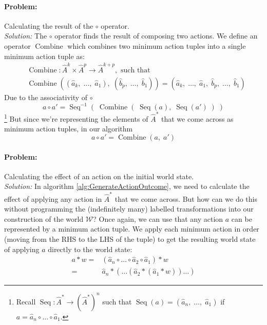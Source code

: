 \paragraph{Problem:}
Calculating the result of the $\circ$ operator.
\\\textit{Solution:}
The $\circ$ operator finds the result of composing two actions.
We define an operator $\operatorname{Combine}$ which combines two minimum action tuples into a single minimum action tuple as:
\begin{equation}
\begin{aligned}
    & \operatorname{Combine}: \hat{A}^{k} \times \hat{A}^{p} \to \hat{A}^{k+p}, \text{ such that} \\
    & \operatorname{Combine}((\hat{a}_{k}, \; \dots, \; \hat{a}_{1}), \; (\hat{b}_{p}, \; \dots, \; \hat{b}_{1})) = (\hat{a}_{k}, \; \dots, \; \hat{a}_{1}, \; \hat{b}_{p}, \; \dots, \; \hat{b}_{1})
\end{aligned}
\end{equation}
Due to the associativity of $\circ$
\begin{equation}
      a \circ a' = \operatorname{Seq}^{-1}(\;\operatorname{Combine}(\;\operatorname{Seq}(a), \; \operatorname{Seq}(a')\;)\;)
\end{equation}
\footnote{
Recall $\operatorname{Seq}: \hat{A}^{*} \to (\hat{A}^{*})^{n}$ such that $\operatorname{Seq}(a) = (\hat{a}_{n}, \; \dots, \; \hat{a}_{1})$ if $a = \hat{a}_{n} \circ \dots \circ \hat{a}_{1}$.
}
But since we're representing the elements of $\hat{A}^{*}$ that we come across as minimum action tuples, in our algorithm
\begin{equation}
    a \circ a' = \operatorname{Combine}(a, \; a')
\end{equation}

\paragraph{Problem:}
Calculating the effect of an action on the initial world state.
\\\textit{Solution:}
In algorithm \ref{alg:GenerateActionOutcome}, we need to calculate the effect of applying any action in $\hat{A}^{*}$ that we come across.
But how can we do this without programming the (indefinitely many) labelled transformations into our construction of the world $\mathscr{W}$?
Once again, we can use that any action $a$ can be represented by a minimum action tuple.
We apply each minimum action in order (moving from the RHS to the LHS of the tuple) to get the resulting world state of applying $a$ directly to the world state:
\begin{equation}
\begin{aligned}
    a * w = & (\hat{a}_{n} \circ \dots \circ \hat{a}_{2} \circ \hat{a}_{1}) * w \\
          = & \hat{a}_{n} * ( \dots (\hat{a}_{2} * (\hat{a}_{1} * w)) \dots)
\end{aligned}
\end{equation}




